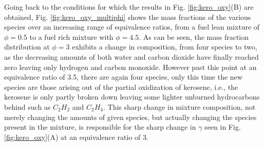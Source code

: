 	Going back to the conditions for which the results in Fig. \ref{fig:kero_oxy}(B) are obtained,
Fig. \ref{fig:kero_oxy_multiphi} shows the mass fractions of the various species over an 
increasing range of equivalence ratios, from a fuel lean mixture of $\phi = 0.5$ to a fuel
rich mixture with $\phi = 4.5$.  As can be seen, the mass fraction distribution at $\phi = 3$ 
exhibits a change in composition, from four species to two, as the decreasing amounts of both water
and carbon dioxide have finally reached zero leaving only hydrogen and carbon monoxide.  However
past this point at an equivalence ratio of 3.5, there are again four species, only this time the
new species are those arising out of the partial oxidization of kerosene, i.e., 
the kerosene is only partly broken down leaving some lighter unburned hydrocarbons behind such as
$C_2H_2$ and $C_2H_4$.  This sharp change in mixture composition, not merely changing the amounts of
given species, but actually changing the species present in the mixture, is responsible for the
sharp change in $\gamma$ seen in Fig. \ref{fig:kero_oxy}(A) at an equivalence ratio of 3.


